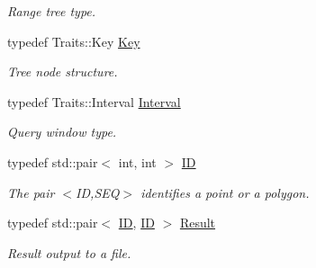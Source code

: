 \begin{DoxyCompactItemize}
\begin{DoxyCompactList}\small\item\em Range tree type. \end{DoxyCompactList}\item 
\hypertarget{namespaceSigSpatial2013_af9823bd0b551eb301830d664ba571a15}{typedef Traits\-::\-Key \hyperlink{namespaceSigSpatial2013_af9823bd0b551eb301830d664ba571a15}{Key}}\label{namespaceSigSpatial2013_af9823bd0b551eb301830d664ba571a15}

\begin{DoxyCompactList}\small\item\em Tree node structure. \end{DoxyCompactList}\item 
\hypertarget{namespaceSigSpatial2013_aac40440b3bd8f75ef62e075b8958fece}{typedef Traits\-::\-Interval \hyperlink{namespaceSigSpatial2013_aac40440b3bd8f75ef62e075b8958fece}{Interval}}\label{namespaceSigSpatial2013_aac40440b3bd8f75ef62e075b8958fece}

\begin{DoxyCompactList}\small\item\em Query window type. \end{DoxyCompactList}\item 
\hypertarget{namespaceSigSpatial2013_a69c1e827245441b25a541c97b741b97c}{typedef std\-::pair$<$ int, int $>$ \hyperlink{namespaceSigSpatial2013_a69c1e827245441b25a541c97b741b97c}{I\-D}}\label{namespaceSigSpatial2013_a69c1e827245441b25a541c97b741b97c}

\begin{DoxyCompactList}\small\item\em The pair $<$I\-D,S\-E\-Q$>$ identifies a point or a polygon. \end{DoxyCompactList}\item 
\hypertarget{namespaceSigSpatial2013_af3568b84c52aee7ab5aa8f15fb019d7f}{typedef std\-::pair$<$ \hyperlink{namespaceSigSpatial2013_a69c1e827245441b25a541c97b741b97c}{I\-D}, \hyperlink{namespaceSigSpatial2013_a69c1e827245441b25a541c97b741b97c}{I\-D} $>$ \hyperlink{namespaceSigSpatial2013_af3568b84c52aee7ab5aa8f15fb019d7f}{Result}}\label{namespaceSigSpatial2013_af3568b84c52aee7ab5aa8f15fb019d7f}

\begin{DoxyCompactList}\small\item\em Result output to a file. \end{DoxyCompactList}\end{DoxyCompactItemize}
